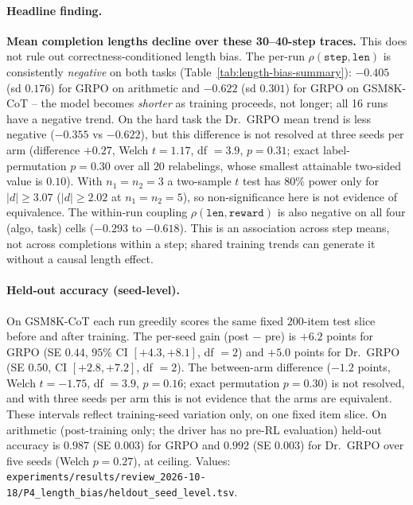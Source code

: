 \paragraph{Headline finding.}
\textbf{Mean completion lengths decline over these 30--40-step traces.}
This does not rule out correctness-conditioned length bias. The per-run
$\rho(\texttt{step}, \texttt{len})$ is consistently \emph{negative}
on both tasks (Table~\ref{tab:length-bias-summary}): $-0.405$ (sd
$0.176$) for GRPO on arithmetic and $-0.622$ (sd $0.301$) for GRPO
on GSM8K-CoT -- the model becomes \emph{shorter} as training
proceeds, not longer; all 16 runs have a negative trend. On the hard
task the Dr.~GRPO mean trend is less negative ($-0.355$ vs $-0.622$),
but this difference is not resolved at three seeds per arm (difference
$+0.27$, Welch $t=1.17$, df $=3.9$, $p=0.31$; exact label-permutation
$p=0.30$ over all $20$ relabelings, whose smallest attainable two-sided
value is $0.10$). With $n_1{=}n_2{=}3$ a two-sample $t$ test has $80\%$
power only for $|d|\ge 3.07$ ($|d|\ge 2.02$ at $n_1{=}n_2{=}5$), so
non-significance here is not evidence of equivalence. The within-run
coupling $\rho(\texttt{len}, \texttt{reward})$ is also negative on
all four (algo, task) cells ($-0.293$ to $-0.618$). This is an
association across step means, not across completions within a step;
shared training trends can generate it without a causal length effect.

\paragraph{Held-out accuracy (seed-level).}
On GSM8K-CoT each run greedily scores the same fixed $200$-item test slice
before and after training. The per-seed gain (post $-$ pre) is
$+6.2$ points for GRPO (SE $0.44$, $95\%$ CI $[+4.3, +8.1]$, df $=2$)
and $+5.0$ points for Dr.~GRPO (SE $0.50$, CI $[+2.8, +7.2]$, df $=2$).
The between-arm difference ($-1.2$ points, Welch $t=-1.75$, df $=3.9$,
$p=0.16$; exact permutation $p=0.30$) is not resolved, and with three
seeds per arm this is not evidence that the arms are equivalent. These
intervals reflect training-seed variation only, on one fixed item slice.
On arithmetic (post-training only; the driver has no pre-RL evaluation)
held-out accuracy is $0.987$ (SE $0.003$) for GRPO and $0.992$
(SE $0.003$) for Dr.~GRPO over five seeds (Welch $p=0.27$), at ceiling.
Values: \texttt{experiments/results/review\_2026-10-18/P4\_length\_bias/heldout\_seed\_level.tsv}.

